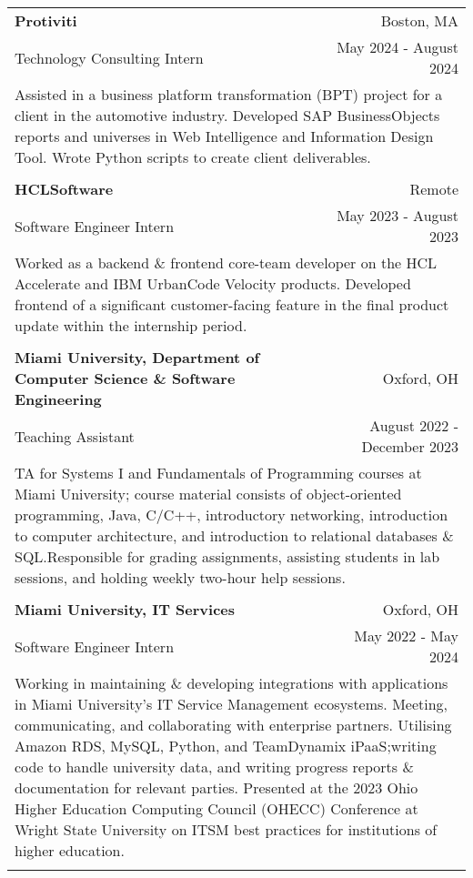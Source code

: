 \documentclass[letterpaper,8pt]{article} %
\begin{document}
\footnotesize{
\begin{tabular*}{\linewidth}{@{\extracolsep{\fill}} lr }

\textbf{Protiviti} & \footnotesize{Boston, MA}\\
\footnotesize{Technology Consulting Intern} & \footnotesize{May 2024 - August 2024}\\
\multicolumn{2}{p{\linewidth}}{\footnotesize{Assisted in a business platform transformation (BPT) project for a client in the automotive industry. Developed SAP BusinessObjects reports and universes in Web Intelligence and Information Design Tool. Wrote Python scripts to create client deliverables.}}\\
\multicolumn{2}{c}{} \\

\textbf{HCLSoftware} & \footnotesize{Remote}\\
\footnotesize{Software Engineer Intern} & \footnotesize{May 2023 - August 2023}\\
\multicolumn{2}{p{\linewidth}}{\footnotesize{Worked as a backend \& frontend core-team developer on the HCL Accelerate and IBM UrbanCode Velocity products. Developed frontend of a significant customer-facing feature in the final product update within the internship period.}}\\
\multicolumn{2}{c}{} \\

\textbf{Miami University, Department of Computer Science \& Software Engineering} & \footnotesize{Oxford, OH}\\
\footnotesize{Teaching Assistant} & \footnotesize{August 2022 - December 2023}\\
\multicolumn{2}{p{\linewidth}}{\footnotesize{TA for Systems I and Fundamentals of Programming courses at Miami University; course material consists of object-oriented programming, Java, C/C++, introductory networking, introduction to computer architecture, and introduction to relational databases \& SQL.\@ Responsible for grading assignments, assisting students in lab sessions, and holding weekly two-hour help sessions.}}\\
\multicolumn{2}{c}{} \\

\textbf{Miami University, IT Services} & \footnotesize{Oxford, OH}\\
\footnotesize{Software Engineer Intern} & \footnotesize{May 2022 - May 2024}\\
\multicolumn{2}{p{\linewidth}}{\footnotesize{Working in maintaining \& developing integrations with applications in Miami University's IT Service Management ecosystems. Meeting, communicating, and collaborating with enterprise partners. Utilising Amazon RDS, MySQL, Python, and TeamDynamix iPaaS;\@ writing code to handle university data, and writing progress reports \& documentation for relevant parties. Presented at the 2023 Ohio Higher Education Computing Council (OHECC) Conference at Wright State University on ITSM best practices for institutions of higher education.}}\\
\multicolumn{2}{c}{} \\


\end{tabular*}}
\end{document}
